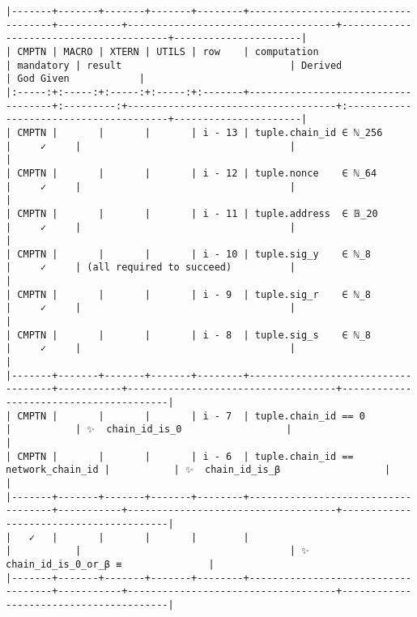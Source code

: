 \documentclass[varwidth=\maxdimen,margin=0.5cm,multi={verbatim}]{standalone}
\begin{document}
\begin{verbatim}
|-------+-------+-------+-------+--------+------------------------------------+-----------+------------------------------------+----------------------------------------+----------------------|
| CMPTN | MACRO | XTERN | UTILS | row    | computation                        | mandatory | result                             | Derived                                | God Given            |
|:-----:+:-----:+:-----:+:-----:+:-------+------------------------------------+:---------:+------------------------------------+:---------------------------------------+----------------------|
| CMPTN |       |       |       | i - 13 | tuple.chain_id ∈ ℕ_256             |     ✓     |                                    |                                        |
| CMPTN |       |       |       | i - 12 | tuple.nonce    ∈ ℕ_64              |     ✓     |                                    |                                        |
| CMPTN |       |       |       | i - 11 | tuple.address  ∈ 𝔹_20              |     ✓     |                                    |                                        |
| CMPTN |       |       |       | i - 10 | tuple.sig_y    ∈ ℕ_8               |     ✓     | (all required to succeed)          |                                        |
| CMPTN |       |       |       | i - 9  | tuple.sig_r    ∈ ℕ_8               |     ✓     |                                    |                                        |
| CMPTN |       |       |       | i - 8  | tuple.sig_s    ∈ ℕ_8               |     ✓     |                                    |                                        |
|-------+-------+-------+-------+--------+------------------------------------+-----------+------------------------------------+----------------------------------------|
| CMPTN |       |       |       | i - 7  | tuple.chain_id == 0                |           | ✨  chain_id_is_0                  |                                        |
| CMPTN |       |       |       | i - 6  | tuple.chain_id == network_chain_id |           | ✨  chain_id_is_β                  |                                        |
|-------+-------+-------+-------+--------+------------------------------------+-----------+------------------------------------+----------------------------------------|
|   ✓   |       |       |       |        |                                    |           |                                    | ✨  chain_id_is_0_or_β ≡               |
|-------+-------+-------+-------+--------+------------------------------------+-----------+------------------------------------+----------------------------------------|

\end{verbatim}
\end{document}
